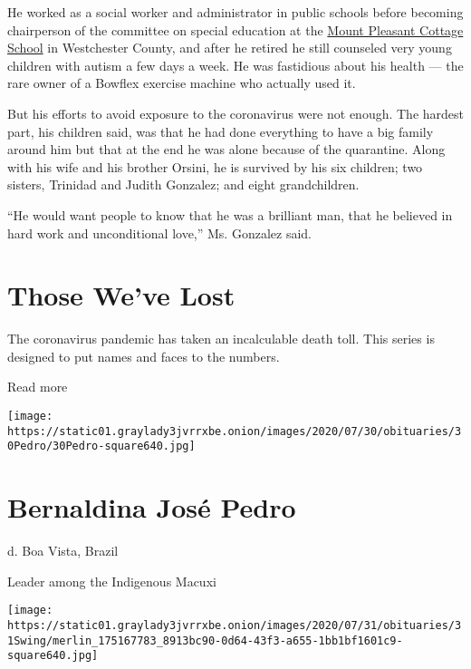 He worked as a social worker and administrator in public schools before
becoming chairperson of the committee on special education at the
\href{https://www.mpcsny.org/}{Mount Pleasant Cottage School} in
Westchester County, and after he retired he still counseled very young
children with autism a few days a week. He was fastidious about his
health --- the rare owner of a Bowflex exercise machine who actually
used it.

But his efforts to avoid exposure to the coronavirus were not enough.
The hardest part, his children said, was that he had done everything to
have a big family around him but that at the end he was alone because of
the quarantine. Along with his wife and his brother Orsini, he is
survived by his six children; two sisters, Trinidad and Judith Gonzalez;
and eight grandchildren.

``He would want people to know that he was a brilliant man, that he
believed in hard work and unconditional love,'' Ms. Gonzalez said.

\href{https://www.nytimes3xbfgragh.onion/interactive/2020/obituaries/people-died-coronavirus-obituaries.html?action=click\&pgtype=Article\&state=default\&region=BELOW_MAIN_CONTENT\&context=covid_obits_promo}{}

\hypertarget{those-weve-lost}{%
\section{Those We've Lost}\label{those-weve-lost}}

The coronavirus pandemic has taken an incalculable death toll. This
series is designed to put names and faces to the numbers.

Read more

\texttt{[image: https://static01.graylady3jvrrxbe.onion/images/2020/07/30/obituaries/30Pedro/30Pedro-square640.jpg]}

\hypertarget{bernaldina-josuxe9-pedro}{%
\section{Bernaldina José Pedro}\label{bernaldina-josuxe9-pedro}}

d. Boa Vista, Brazil

Leader among the Indigenous Macuxi

\texttt{[image: https://static01.graylady3jvrrxbe.onion/images/2020/07/31/obituaries/31Swing/merlin\_175167783\_8913bc90-0d64-43f3-a655-1bb1bf1601c9-square640.jpg]}


